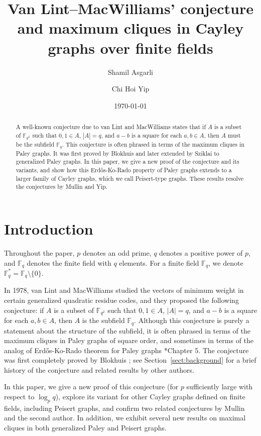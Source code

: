 \documentclass[12pt,reqno]{amsart}
\title{Van Lint--MacWilliams' conjecture and maximum cliques in Cayley graphs over finite fields}
\author{Shamil Asgarli}
\author{Chi Hoi Yip}
\date{\today}
\theoremstyle{definition}
\newcommand{\F}{\mathbb{F}}
\begin{document}
\maketitle

\begin{abstract}
A well-known conjecture due to van Lint and MacWilliams states that if $A$ is a subset of $\F_{q^2}$ such that $0,1 \in A$, $|A|=q$, and $a-b$ is a square for each $a,b \in A$, then $A$ must be the subfield $\F_q$. This conjecture is often phrased in terms of the maximum cliques in Paley graphs. It was first proved by Blokhuis and later extended by Sziklai to generalized Paley graphs. In this paper, we give a new proof of the conjecture and its variants, and show how this Erd\H{o}s-{K}o-{R}ado property of Paley graphs extends to a larger family of Cayley graphs, which we call Peisert-type graphs. These results resolve the conjectures by Mullin and Yip.
\end{abstract}

\section{Introduction}\label{sect:intro}
Throughout the paper, $p$ denotes an odd prime, $q$ denotes a positive power of $p$, and $\F_q$ denotes the finite field with $q$ elements. For a finite field $\F_q$, we denote $\F_q^*=\F_q\setminus \{0\}$. 

In 1978, van Lint and MacWilliams \cite{vLM78} studied the vectors of minimum weight in certain generalized quadratic residue codes, and they proposed the following conjecture: if $A$ is a subset of $\F_{q^2}$ such that $0,1 \in A$, $|A|=q$, and $a-b$ is a square for each $a,b \in A$, then $A$ is the subfield $\F_q$. Although this conjecture is purely a statement about the structure of the subfield, it is often phrased in terms of the maximum cliques in Paley graphs of square order, and sometimes in terms of the analog of Erd\H{o}s-{K}o-{R}ado theorem for Paley graphs \cite{GM}*{Chapter 5}.  The conjecture was first completely proved by Blokhuis \cite{Blo84}; see Section~\ref{sect:background} for a brief history of the conjecture and related results by other authors.

In this paper, we give a new proof of this conjecture (for $p$ sufficiently large with respect to $\log_p q$), explore its variant for other Cayley graphs defined on finite fields, including Peisert graphs, and confirm two related conjectures by Mullin and the second author. In addition, we exhibit several new results on maximal cliques in both generalized Paley and Peisert graphs.
\end{document}
